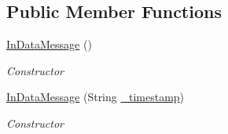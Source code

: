\subsection*{Public Member Functions}
\begin{DoxyCompactItemize}
\item 
\hyperlink{class_web_analyzer_1_1_models_1_1_message_model_1_1_in_data_message_aeb6ca5c7fb12aee16cfc47a0bef803b4}{In\+Data\+Message} ()
\begin{DoxyCompactList}\small\item\em Constructor \end{DoxyCompactList}\item 
\hyperlink{class_web_analyzer_1_1_models_1_1_message_model_1_1_in_data_message_a7fcbbb880450beda0bbe836ed3a95084}{In\+Data\+Message} (String \hyperlink{class_web_analyzer_1_1_models_1_1_message_model_1_1_message_ae1e243f35e213e08ec2bdc54f64b0d2e}{\+\_\+timestamp})
\begin{DoxyCompactList}\small\item\em Constructor \end{DoxyCompactList}\end{DoxyCompactItemize}
